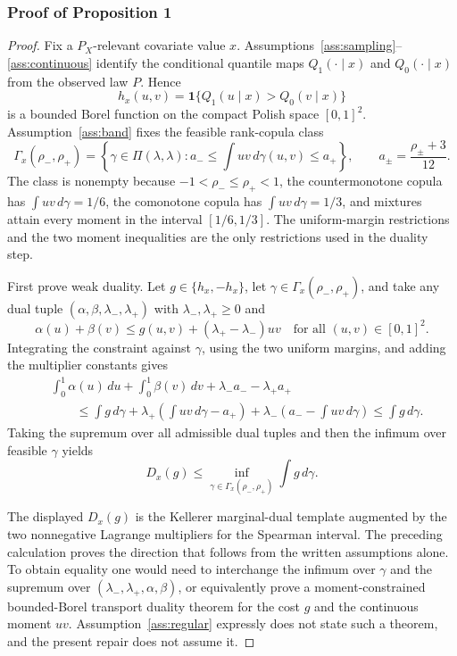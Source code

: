 \documentclass[11pt]{article}
\newcommand{\one}{\mathbf{1}}
\theoremstyle{definition}
\theoremstyle{plain}
\theoremstyle{remark}
\begin{document}
\subsubsection*{Proof of Proposition 1}
\begin{proof}
Fix a \(P_X\)-relevant covariate value \(x\).  Assumptions~\ref{ass:sampling}--\ref{ass:continuous} identify the conditional quantile maps \(Q_1(\cdot\mid x)\) and \(Q_0(\cdot\mid x)\) from the observed law \(P\).  Hence
\[
h_x(u,v)=\one\{Q_1(u\mid x)>Q_0(v\mid x)\}
\]
is a bounded Borel function on the compact Polish space \([0,1]^2\).  Assumption~\ref{ass:band} fixes the feasible rank-copula class
\[
\Gamma_x(\rho_-,\rho_+)=
\left\{\gamma\in\Pi(\lambda,\lambda):
a_-\le \int uv\,d\gamma(u,v)\le a_+\right\},
\qquad
a_\pm=\frac{\rho_\pm+3}{12}.
\]
The class is nonempty because \(-1<\rho_-\le\rho_+<1\), the countermonotone copula has \(\int uv\,d\gamma=1/6\), the comonotone copula has \(\int uv\,d\gamma=1/3\), and mixtures attain every moment in the interval \([1/6,1/3]\).  The uniform-margin restrictions and the two moment inequalities are the only restrictions used in the duality step.

First prove weak duality.  Let \(g\in\{h_x,-h_x\}\), let \(\gamma\in\Gamma_x(\rho_-,\rho_+)\), and take any dual tuple \((\alpha,\beta,\lambda_-,\lambda_+)\) with \(\lambda_-,\lambda_+\ge0\) and
\[
\alpha(u)+\beta(v)\le g(u,v)+(\lambda_+-\lambda_-)uv
\quad\text{for all }(u,v)\in[0,1]^2.
\]
Integrating the constraint against \(\gamma\), using the two uniform margins, and adding the multiplier constants gives
\[
\begin{aligned}
&\int_0^1\alpha(u)\,du+\int_0^1\beta(v)\,dv+\lambda_-a_- -\lambda_+a_+\\
&\qquad\le
\int g\,d\gamma
+\lambda_+\left(\int uv\,d\gamma-a_+\right)
+\lambda_-\left(a_--\int uv\,d\gamma\right)
\le \int g\,d\gamma.
\end{aligned}
\]
Taking the supremum over all admissible dual tuples and then the infimum over feasible \(\gamma\) yields
\[
D_x(g)\le \inf_{\gamma\in\Gamma_x(\rho_-,\rho_+)}\int g\,d\gamma.
\]

The displayed \(D_x(g)\) is the Kellerer marginal-dual template \cite{Kellerer1984Duality} augmented by the two nonnegative Lagrange multipliers for the Spearman interval.  The preceding calculation proves the direction that follows from the written assumptions alone.  To obtain equality one would need to interchange the infimum over \(\gamma\) and the supremum over \((\lambda_-,\lambda_+,\alpha,\beta)\), or equivalently prove a moment-constrained bounded-Borel transport duality theorem for the cost \(g\) and the continuous moment \(uv\).  Assumption~\ref{ass:regular} expressly does not state such a theorem, and the present repair does not assume it.


\end{proof}
\end{document}
